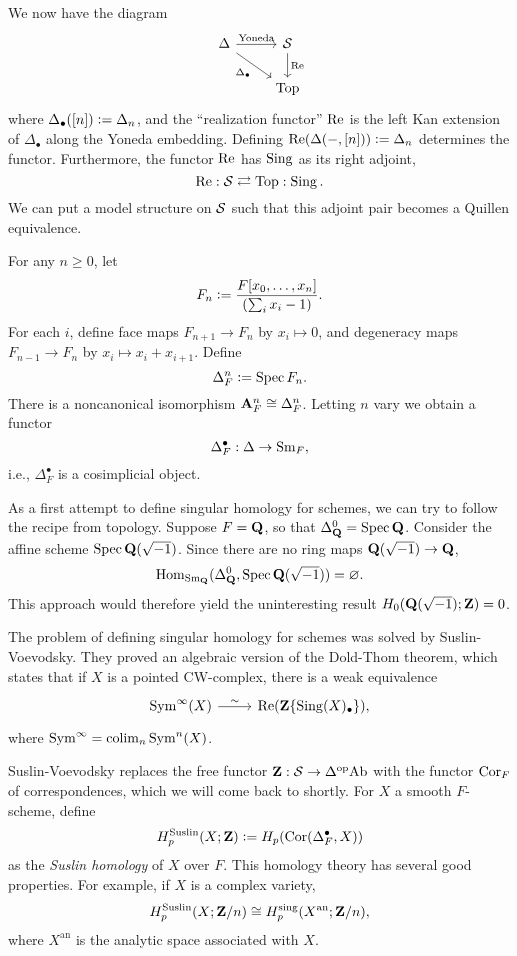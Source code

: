 We now have the diagram
\[\begin{tikzcd}\Delta\arrow{r}{\text{Yoneda}}\arrow{dr}[swap]{\Delta_\bullet} & \calS\arrow{d}{\re} \\
& \Top\end{tikzcd}\]
where $\Delta_\bullet([n])\defeq\Delta_n$, and the ``realization functor'' $\re$ is the left Kan extension of $\Delta_\bullet$ along the Yoneda embedding. Defining $\re(\Delta(-,[n]))\defeq\Delta_n$ determines the functor. Furthermore, the functor $\re$ has $\Sing$ as its right adjoint,
\[
\re:\calS\rightleftarrows\Top:\Sing.
\]
We can put a model structure on $\calS$ such that this adjoint pair becomes a Quillen equivalence.

\begin{example}
For any $n\ge0$, let
\[
F_n\defeq \dfrac{F[x_0,\dots,x_n]}{\p*{\sum_ix_i-1}}.
\]
For each $i$, define face maps $F_{n+1}\to F_n$ by $x_i\mapsto0$, and degeneracy maps $F_{n-1}\to F_n$ by $x_i\mapsto x_i+x_{i+1}$. Define
\[
\Delta_F^n\defeq\Spec F_n.
\]There is a noncanonical isomorphism $\A^n_F\cong\Delta_F^n$. Letting $n$ vary we obtain a functor
\[
\Delta_F^\bullet:\Delta\to\Sm_F,
\]i.e., $\Delta_F^\bullet$ is a cosimplicial object.
\end{example}

\begin{example}
As a first attempt to define singular homology for schemes, we can try to follow the recipe from topology. Suppose $F=\Q$, so that $\Delta_\Q^0=\Spec\Q$. Consider the affine scheme $\Spec\Q(\sqrt{-1})$. Since there are no ring maps $\Q(\sqrt{-1})\to\Q$,
\[
\Hom_{\Sm_\Q}(\Delta_\Q^0,\Spec\Q(\sqrt{-1}))=\varnothing.
\]This approach would therefore yield the uninteresting result $H_0(\Q(\sqrt{-1});\Z)=0$.
\end{example}
The problem of defining singular homology for schemes was solved by Suslin-Voevodsky. They proved an algebraic version of the Dold-Thom theorem, which states that if $X$ is a pointed CW-complex, there is a weak equivalence
\[\begin{tikzcd}
\Sym^\infty(X)\arrow{r}{\sim} & \re(\Z\{\Sing(X)_\bullet\}),
\end{tikzcd}\]
where $\Sym^\infty=\colim_n\Sym^n(X)$.

Suslin-Voevodsky replaces the free functor $\Z:\calS\to\Delta^\op\Ab$ with the functor $\Cor_F$ of correspondences, which we will come back to shortly. For $X$ a smooth $F$-scheme, define
\[
H^{\text{Suslin}}_p(X;\Z)\defeq H_p(\Cor(\Delta_F^\bullet,X))
\]as the \emph{Suslin homology} of $X$ over $F$. This homology theory has several good properties. For example, if $X$ is a complex variety,
\[
H^{\text{Suslin}}_p(X;\Z/n)\cong H_p^{\text{sing}}(X^{\text{an}};\Z/n),
\]where $X^{\text{an}}$ is the analytic space associated with $X$.

